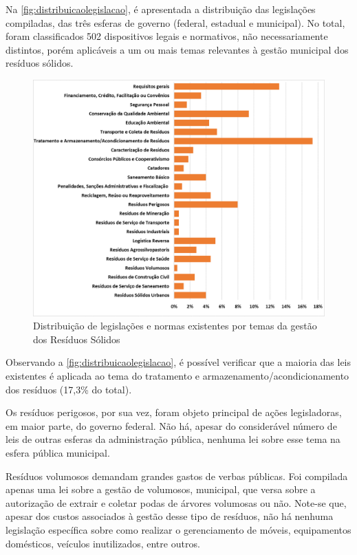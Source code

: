 	Na \autoref{fig:distribuicaolegislacao}, é apresentada a distribuição das legislações compiladas, das três esferas de governo (federal, estadual e municipal). No total, foram classificados 502 dispositivos legais e normativos, não necessariamente distintos, porém aplicáveis a um ou mais temas relevantes à gestão municipal dos resíduos sólidos.
	
	\begin{figure}[h!]
		\centering
		\includegraphics[width=\linewidth]{produtos/produm/distribuicaolegislacao}
		\caption{Distribuição de legislações e normas existentes por temas da gestão dos Resíduos Sólidos}
		\label{fig:distribuicaolegislacao}
	\end{figure}
	
	
	Observando a \autoref{fig:distribuicaolegislacao}, é possível verificar que a maioria das leis existentes é aplicada ao tema do tratamento e armazenamento/acondicionamento dos resíduos (17,3\% do total).
	
	Os resíduos perigosos, por sua vez, foram objeto principal de ações legisladoras, em maior parte, do governo federal. Não há, apesar do considerável número de leis de outras esferas da administração pública, nenhuma lei sobre esse tema na esfera pública municipal.
	
	Resíduos volumosos demandam grandes gastos de verbas públicas. Foi compilada apenas uma lei sobre a gestão de volumosos, municipal, que versa sobre a autorização de extrair e coletar podas de árvores volumosas ou não. Note-se que, apesar dos custos associados à gestão desse tipo de resíduos, não há nenhuma legislação específica sobre como realizar o gerenciamento de móveis, equipamentos domésticos, veículos inutilizados, entre outros.
	
